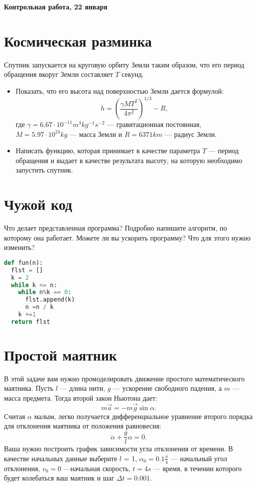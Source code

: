 \documentclass[a4paper,12pt]{article}
\begin{document}
\begin{center}
\Large{\textbf{Контрольная работа, 22 января}}
\end{center}
\section{Космическая разминка}
Спутник запускается на круговую орбиту Земли таким образом, что его период обращения вкоруг Земли составляет $T$ секунд.
\begin{itemize}
\item Показать, что его высота над поверхностью Земли дается формулой:
$$h =  \left( \frac{\gamma M T^2}{4\pi^2} \right)^{1/3} - R,$$
где $\gamma = 6.67 \cdot 10^{-11} m^3 kg^{-1} s^{-2}$ --- гравитационная постоянная, $M = 5.97 \cdot 10^{24} kg$ --- масса Земли и $R = 6371 km$ --- радиус Земли.
\item Написать функцию, которая принимает в качестве параметра $T$ --- период обращения и выдает в качестве результата высоту, на которую необходимо запустить спутник.
\end{itemize}
\section{Чужой код}
Что делает представленная программа? Подробно напишите алгоритм, по которому она работает. Можете ли вы ускорить программу? Что для этого нужно изменить?
\begin{lstlisting}[language=python]
def fun(n):
  flst = []
  k = 2
  while k <= n:
  	while n%k == 0:
  	  flst.append(k)
  	  n =n / k
  	k +=1
  return flst
\end{lstlisting}
\section{Простой маятник}
В этой задаче вам нужно промоделировать движение простого математического маятника. Пусть $l$ --- длина нити, $g$ --- ускорение свободного падения, а $m$ --- масса предмета. Тогда второй закон Ньютона дает:
$$m \vec{a} = -m \vec{g} \sin \alpha .$$
Считая $\alpha$ малым, легко получается дифференциальное уравнение второго порядка для отклонения маятника от положения равновесия:
$$\ddot{\alpha} + \frac{g}{l} \alpha = 0 .$$
Ваша нужно построить график зависимости угла отклонения от времени. В качестве начальных данные выберите $l$ = 1,  $\alpha_0 = 0.1 \frac{\pi}{4}$ --- начальный угол отклонения, $v_0 = 0$ ---начальная скорость, $t = 4 s$ --- время, в течении которого будет колебаться ваш маятник и шаг $\Delta t = 0.001$. 
\end{document}
